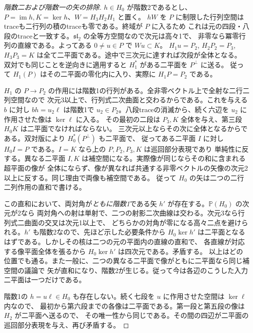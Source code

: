 \begin{proof}[階数二および階数一の矢の排除]
$h\in H_0$ が階数2であるとし、$P=\operatorname{im}h, K=\ker h$、$W=H_3H_2H_1$ と置く。
$hW$ を $P$ に制限した行列空間はtraceも二行列の積のtraceも零である。終域が $P$ に入るため
これは元の四段・八段のtraceと一致する。$\mathfrak{sl}_2$ の全等方空間なので次元は高々1で、
非零なら冪零行列の直線である。よってある $0\ne u\in P$ で $Wu\subset K$。
$H_1u=P_2$, $H_2 P_2=P_3$, $H_3 P_3=K$ は全て二平面である。途中で三次元に達すれば次段が全体となる。
双対でも同じことを逆向きに適用すると $H_1^*$ がある二平面を $P^\perp$ に送る。
従って $H_1(P)$ はその二平面の零化内に入り、実際に $H_1P=P_2$ である。

$H_1$ の $P\to P_2$ の作用には階数1の行列がある。全非零ベクトル上で全射な二行二列空間なので
次元3以上で、行列式二次曲面と交わるからである。これを与える $b$ に対し $bh=u_2\ell$ は階数1で
$u_2\in P_2$。八段traceの消滅から、続く六辺を $u_2$ に作用させた像は $\ker\ell$ に入る。
その最初の二段は $P_3,K$ 全体を与え、第三段 $H_0K$ は二平面でなければならない。
三次元以上ならその次に全体となるからである。双対版により $H_0^*(P^\perp)$ も二平面で、
従ってある二平面 $I$ に対し $H_0 I=P$ である。$I=K$ なら上の $P,P_2,P_3,K$ は巡回部分表現であり
単純性に反する。異なる二平面 $I,K$ は補空間になる。実際像が同じならその和に含まれる超平面の像が
全体にならず、像が異なれば共通する非零ベクトルの矢像の次元2以上に反する。同じ理由で両像も補空間である。
従って $H_0$ の矢は二つの二行二列作用の直和で書ける。

この直和において、両対角が\emph{ともに階数1}である矢 $h'$ が存在する。$\mathbb P(H_0)$ の次元が2なら
両対角への射は単射で、二つの射影二次曲線は交わる。次元3なら行列式二曲面の交叉は次元1以上で、
どちらかの対角が零になる高々二点を避けられる。$h'$ も階数2なので、先ほど示した必要条件から
$H_0\ker h'$ は二平面となるはずである。しかしその核は二つの元の平面内の直線の直和で、
各直線が対応する像平面全体を張るから $H_0\ker h'$ は四次元である。矛盾する。
以上はどの位置でも通る。また一般に、二つの異なる二平面で像がともに二平面なら同じ補空間の議論で
矢が直和になり、階数2が生じる。従って今は各辺のこうした入力二平面は一つだけである。

階数1の $h=u\ell\in H_0$ も存在しない。続く七段を $u$ に作用させた空間は $\ker\ell$ 内なので、
最初から第六段までの各像は二平面である。第一段と第五段の像は $H_2$ が二平面へ送るので、
その唯一性から同じである。その間の四辺が二平面の巡回部分表現を与え、再び矛盾する。
\end{proof}

